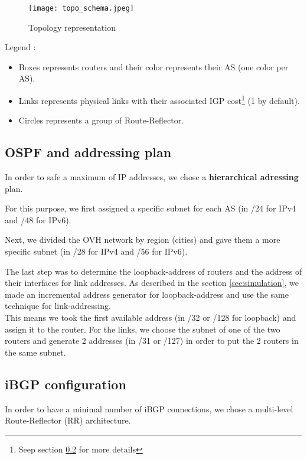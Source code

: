 \documentclass[letter, 9pt, conference]{ieeeconf}
\begin{document}
\begin{figure}[h!]
    \texttt{[image: topo\_schema.jpeg]}
    \caption{Topology representation}
    \label{fig:topo_schema}
\end{figure}

Legend : 
\begin{itemize}
    \item Boxes represents routers and their color represents their AS (one color per AS). 
    \item Links represents physical links with their associated IGP cost\footnote{Seep section \ref{sec:ibgp} for more details} (1 by default). 
    \item Circles represents a group of Route-Reflector. 
\end{itemize}



\subsection{OSPF and addressing plan}
\label{sec:ospf}

In order to safe a maximum of IP addresses, we chose a \textbf{hierarchical adressing} plan. 

For this purpose, we first assigned a specific subnet for each AS (in /24 for IPv4 and /48 for IPv6). 

Next, we divided the OVH network by region (cities) and gave them a more specific subnet (in /28 for IPv4 and /56 for IPv6). 

The last step was to determine the loopback-address of routers and the address of their interfaces for link addresses. As described in the section \ref{sec:simulation}, we made an incremental address generator for loopback-address and use the same technique for link-addressing. \\
This means we took the first available address (in /32 or /128 for loopback) and assign it to the router. For the links, we choose the subnet of one of the two routers and generate 2 addresses (in /31 or /127) in order to put the 2 routers in the same subnet. 


\subsection{iBGP configuration}
\label{sec:ibgp}

In order to have a minimal number of iBGP connections, we chose a multi-level Route-Reflector (RR) architecture. 
\end{document}
